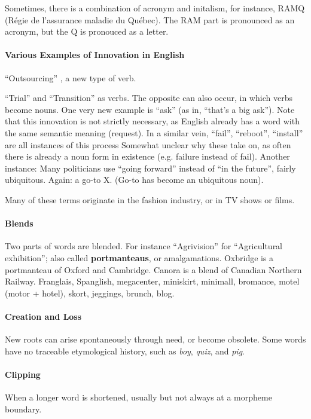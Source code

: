 \documentclass{exam}
\begin{document}
Sometimes, there is a combination of acronym and initalism, for instance, RAMQ (R\'egie de l'assurance maladie du Qu\'ebec).
The RAM part is pronounced as an acronym, but the Q is pronouced as a letter.  
\paragraph{Various Examples of Innovation in English}
``Outsourcing'' , a new type of verb.

``Trial'' and ``Transition'' as verbs. 
The opposite can also occur, in which verbs become nouns. 
One very new example is ``ask'' (as in, ``that's a big ask'').
Note that this innovation is not strictly necessary, as English already has a word with the same semantic meaning (request). 
In a similar vein, ``fail'', ``reboot'', ``install'' are all instances of this process 
Somewhat unclear why these take on, as often there is already a noun form in existence (e.g. failure instead of fail). 
Another instance: Many politicians use ``going forward'' instead of ``in the future'', fairly ubiquitous. 
Again: a go-to X. (Go-to has become an ubiquitous noun).

Many of these terms originate in the fashion industry, or in TV shows or films. 

\paragraph{Blends}  Two parts of words are blended. For instance ``Agrivision'' for ``Agricultural exhibition''; also called \textbf{portmanteaus}, or amalgamations.
Oxbridge is a portmanteau of Oxford and Cambridge.
Canora is a blend of Canadian Northern Railway. Franglais, Spanglish, megacenter, miniskirt, minimall, bromance, motel (motor + hotel), skort, jeggings, brunch, blog.   

\paragraph{Creation and Loss}
New roots can arise spontaneously through need, or become obsolete. 
Some words have no traceable etymological history, such as \textit{boy}, \textit{quiz}, and \textit{pig}. 


\paragraph{Clipping} When a longer word is shortened, usually but not always at a morpheme boundary. 
\end{document}
